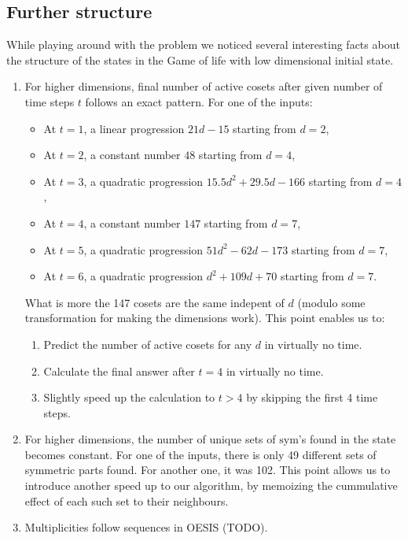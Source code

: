 \documentclass[]{article}
\newcommand{\sym}{\mathrm{sym}}
\begin{document}
	\subsection{Further structure}
	While playing around with the problem we noticed several interesting facts about the structure of the states in the Game of life with low dimensional initial state.
	\begin{enumerate}
		\item For higher dimensions, final number of active cosets after given number of time steps $t$ follows an exact pattern. For one of the inputs:
		\begin{itemize}
			\item At $t=1$, a linear progression $21d - 15$ starting from $d=2$,
			\item At $t=2$, a constant number $48$ starting from $d=4$,
			\item At $t=3$, a quadratic progression $15.5d^2 + 29.5d - 166$ starting from $d=4$,
			\item At $t=4$, a constant number $147$ starting from $d=7$,
			\item At $t=5$, a quadratic progression $51d^2 - 62d - 173$ starting from $d=7$,
			\item At $t=6$, a quadratic progression $d^2 + 109d + 70$ starting from $d=7$.
		\end{itemize}
		What is more the 147 cosets are the same indepent of $d$ (modulo some transformation for making the dimensions work).
		This point enables us to:
		\begin{enumerate}
			\item Predict the number of active cosets for any $d$ in virtually no time.
			\item Calculate the final answer after $t=4$ in virtually no time.
			\item Slightly speed up the calculation to $t>4$ by skipping the first 4 time steps.
		\end{enumerate}
		
		\item For higher dimensions, the number of unique sets of $\sym$'s found in the state becomes constant. For one of the inputs,
		there is only 49 different sets of symmetric parts found. For another one, it was 102.
		This point allows us to introduce another speed up to our algorithm, by memoizing the cummulative effect of each such set to their neighbours.
		
		\item Multiplicities follow sequences in OESIS (TODO).
	\end{enumerate}
\end{document}
